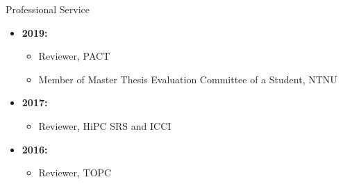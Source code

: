 \documentclass{resume} %
\begin{document}
\begin{rSection}{Professional Service}
\begin{itemize}
\begin{itemize}
	\end{itemize}
	\item  \textbf{2019:}
	\begin{itemize}
		\item Reviewer, PACT
		\item Member of Master Thesis Evaluation Committee of a Student, NTNU
	\end{itemize}
	\item  \textbf{2017:}
	\begin{itemize}
		\item Reviewer, HiPC SRS and ICCI
	\end{itemize}
	\item  \textbf{2016:}
	\begin{itemize}
		\item Reviewer, TOPC
	\end{itemize}
\end{itemize}
\end{rSection}
\end{document}
